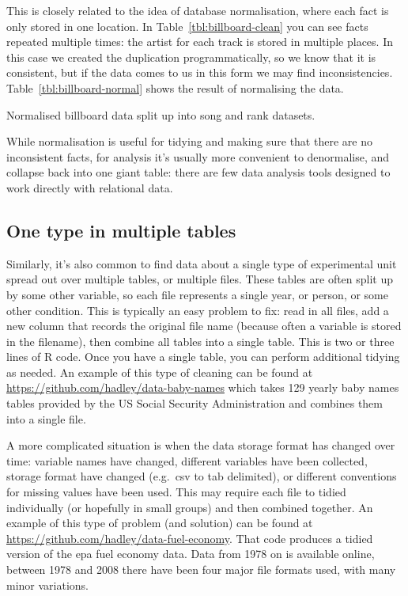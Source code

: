 \documentclass[oneside]{article}
\begin{document}

This is closely related to the idea of database normalisation, where each fact is only stored in one location. In Table~\ref{tbl:billboard-clean} you can see facts repeated multiple times: the artist for each track is stored in multiple places. In this case we created the duplication programmatically, so we know that it is consistent, but if the data comes to us in this form we may find inconsistencies. Table~\ref{tbl:billboard-normal} shows the result of normalising the data.

\begin{table}
  \centering
  
  

  \caption{Normalised billboard data split up into song and rank datasets.}
  \label{tbl:billboard-normal}
\end{table}

While normalisation is useful for tidying and making sure that there are no inconsistent facts, for analysis it's usually more convenient to denormalise, and collapse back into one giant table: there are few data analysis tools designed to work directly with relational data.

\subsection{One type in multiple tables}

Similarly, it's also common to find data about a single type of experimental unit spread out over multiple tables, or multiple files. These tables are often split up by some other variable, so each file represents a single year, or person, or some other condition. This is typically an easy problem to fix: read in all files, add a new column that records the original file name (because often a variable is stored in the filename), then combine all tables into a single table. This is two or three lines of R code. Once you have a single table, you can perform additional tidying as needed. An example of this type of cleaning can be found at \url{https://github.com/hadley/data-baby-names} which takes 129 yearly baby names tables provided by the US Social Security Administration and combines them into a single file.

A more complicated situation is when the data storage format has changed over time: variable names have changed, different variables have been collected, storage format have changed (e.g.\ csv to tab delimited), or different conventions for missing values have been used. This may require each file to tidied individually (or hopefully in small groups) and then combined together. An example of this type of problem (and solution) can be found at \url{https://github.com/hadley/data-fuel-economy}. That code produces a tidied version of the {\sc epa} fuel economy data. Data from 1978 on is available online, between 1978 and 2008 there have been four major file formats used, with many minor variations.
\end{document}
